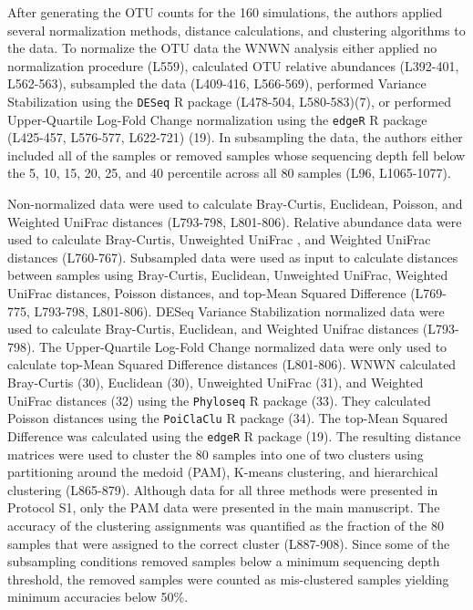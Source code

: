 \documentclass[
]{article}
\begin{document}
After generating the OTU counts for the 160 simulations, the authors
applied several normalization methods, distance calculations, and
clustering algorithms to the data. To normalize the OTU data the WNWN
analysis either applied no normalization procedure (L559), calculated
OTU relative abundances (L392-401, L562-563), subsampled the data
(L409-416, L566-569), performed Variance Stabilization using the
\texttt{DESeq} R package (L478-504, L580-583)(7), or performed
Upper-Quartile Log-Fold Change normalization using the \texttt{edgeR} R
package (L425-457, L576-577, L622-721) (19). In subsampling the data,
the authors either included all of the samples or removed samples whose
sequencing depth fell below the 5, 10, 15, 20, 25, and 40 percentile
across all 80 samples (L96, L1065-1077).

Non-normalized data were used to calculate Bray-Curtis, Euclidean,
Poisson, and Weighted UniFrac distances (L793-798, L801-806). Relative
abundance data were used to calculate Bray-Curtis, Unweighted UniFrac ,
and Weighted UniFrac distances (L760-767). Subsampled data were used as
input to calculate distances between samples using Bray-Curtis,
Euclidean, Unweighted UniFrac, Weighted UniFrac distances, Poisson
distances, and top-Mean Squared Difference (L769-775, L793-798,
L801-806). DESeq Variance Stabilization normalized data were used to
calculate Bray-Curtis, Euclidean, and Weighted Unifrac distances
(L793-798). The Upper-Quartile Log-Fold Change normalized data were only
used to calculate top-Mean Squared Difference distances (L801-806). WNWN
calculated Bray-Curtis (30), Euclidean (30), Unweighted UniFrac (31),
and Weighted UniFrac distances (32) using the \texttt{Phyloseq} R
package (33). They calculated Poisson distances using the
\texttt{PoiClaClu} R package (34). The top-Mean Squared Difference was
calculated using the \texttt{edgeR} R package (19). The resulting
distance matrices were used to cluster the 80 samples into one of two
clusters using partitioning around the medoid (PAM), K-means clustering,
and hierarchical clustering (L865-879). Although data for all three
methods were presented in Protocol S1, only the PAM data were presented
in the main manuscript. The accuracy of the clustering assignments was
quantified as the fraction of the 80 samples that were assigned to the
correct cluster (L887-908). Since some of the subsampling conditions
removed samples below a minimum sequencing depth threshold, the removed
samples were counted as mis-clustered samples yielding minimum
accuracies below 50\%.
\end{document}
